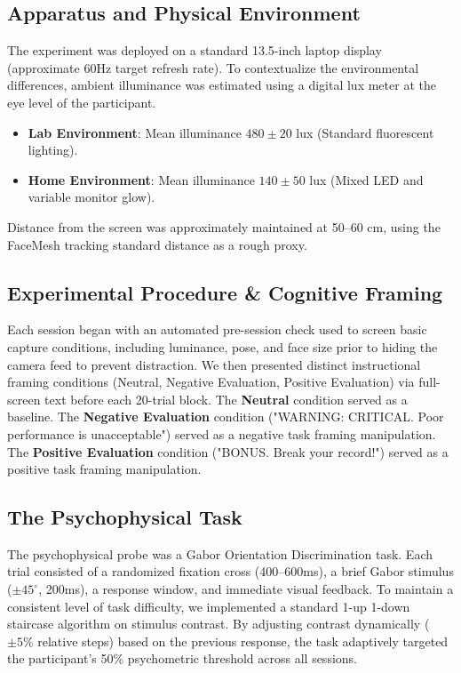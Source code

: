 \documentclass[dvipdfmx]{ehis}
\begin{document}
\subsection{Apparatus and Physical Environment}
The experiment was deployed on a standard 13.5-inch laptop display (approximate 60Hz target refresh rate).
To contextualize the environmental differences, ambient illuminance was estimated using a digital lux meter at the eye level of the participant.
\begin{itemize}
    \item \textbf{Lab Environment}: Mean illuminance $480 \pm 20$ lux (Standard fluorescent lighting).
    \item \textbf{Home Environment}: Mean illuminance $140 \pm 50$ lux (Mixed LED and variable monitor glow).
\end{itemize}
Distance from the screen was approximately maintained at 50--60 cm, using the FaceMesh tracking standard distance as a rough proxy.

\subsection{Experimental Procedure \& Cognitive Framing}
Each session began with an automated pre-session check used to screen basic capture conditions, including luminance, pose, and face size prior to hiding the camera feed to prevent distraction. 
We then presented distinct instructional framing conditions (Neutral, Negative Evaluation, Positive Evaluation) via full-screen text before each 20-trial block. 
The \textbf{Neutral} condition served as a baseline. The \textbf{Negative Evaluation} condition ("WARNING: CRITICAL. Poor performance is unacceptable") served as a negative task framing manipulation. The \textbf{Positive Evaluation} condition ("BONUS. Break your record!") served as a positive task framing manipulation.

\subsection{The Psychophysical Task}
The psychophysical probe was a Gabor Orientation Discrimination task. Each trial consisted of a randomized fixation cross (400--600ms), a brief Gabor stimulus ($\pm 45^\circ$, 200ms), a response window, and immediate visual feedback. 
To maintain a consistent level of task difficulty, we implemented a standard 1-up 1-down staircase algorithm on stimulus contrast. By adjusting contrast dynamically ($\pm 5\%$ relative steps) based on the previous response, the task adaptively targeted the participant's 50\% psychometric threshold across all sessions.
\end{document}
